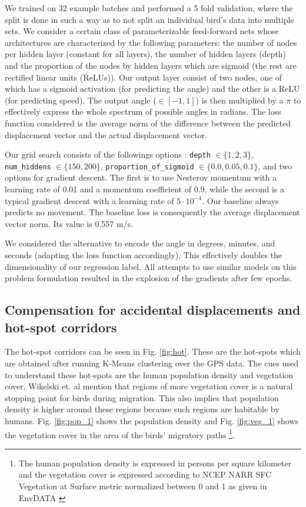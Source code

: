 \documentclass[letterpaper, 10pt, conference]{ieeeconf}  %
\begin{document}
	We trained on 32 example batches and performed a 5 fold validation, where the split is done in such a way as to not split an individual bird's data into multiple sets. We consider a certain class of parameterizable feed-forward nets whose architectures are characterized by the following parameters: the number of nodes per hidden layer (constant for all layers), the number of hidden layers (depth) and the proportion of the nodes by hidden layers which are sigmoid (the rest are rectified linear units (ReLUs)). Our output layer consist of two nodes, one of which has a sigmoid activation (for predicting the angle) and the other is a ReLU (for predicting speed). The output angle ($\in [-1,1]$) is then multiplied by a $\pi$ to effectively express the whole spectrum of possible angles in radians. The loss function considered is the average norm of the difference between the predicted displacement vector and the actual displacement vector. 

	Our grid search consists of the followings options : \texttt{depth} $\in \{1,2,3\}$, \texttt{num\_hiddens} $\in \{150,200\}$, \texttt{proportion\_of\_sigmoid} $\in \{0.0,0.05,0.1\}$, and two options for gradient descent. The first is to use Nesterov momentum with a learning rate of 0.01 and a momentum coefficient of 0.9, while the second is a typical gradient descent with a learning rate of $5 \cdot {10}^{-4}$.  Our baseline always predicts no movement. The baseline loss is consequently the average displacement vector norm. Its value is 0.557 m/s. 

	We considered the alternative to encode the angle in degrees, minutes, and seconds (adapting the loss function accordingly). This effectively doubles the dimensionality of our regression label. All attempts to use similar models on this problem formulation resulted in the explosion of the gradients after few epochs.

\subsection{Compensation for accidental displacements and hot-spot corridors}
	The hot-spot corridors can be seen in Fig. \ref{fig:hot}. These are the hot-spots which are obtained after running K-Means clustering over the GPS data. The cues used to understand these hot-spots are the human population density and vegetation cover. Wikelski et. al mention that regions of more vegetation cover is a natural stopping point for birds during migration. This also implies that population density is higher around these regions because such regions are habitable by humans. Fig. \ref{fig:pop_1} shows the population density and Fig. \ref{fig:veg_1} shows the vegetation cover in the area of the birds' migratory paths \footnote{The human population density is expressed in persons per square kilometer and the vegetation cover is expressed according to NCEP NARR SFC Vegetation at Surface metric normalized between 0 and 1 as given in EnvDATA \cite{envdata}}.
\end{document}
